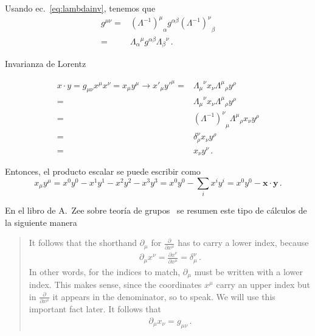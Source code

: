 \begin{frame}
Usando ec.~\eqref{eq:lambdainv}, tenemos que
\begin{align}
  \label{eq:Lambdacontra}
  g^{\mu\nu}=&{\left( \Lambda^{-1} \right)^{\mu}}_{\alpha}g^{\alpha\beta} {\left( \Lambda^{-1} \right)^{\nu}}_{\beta}\nonumber\\
=&{\Lambda_{\alpha}}^{\mu}g^{\alpha\beta}{\Lambda_{\beta}}^{\nu}\,.           
\end{align}


\end{frame}



\begin{frame}
\begin{example}
  


Invarianza de Lorentz

  \begin{align}
  x\cdot y= g_{\mu\nu}x^{\mu}x^{\nu}=  x_\mu y^\mu\to x'_\mu{y'}^\mu=&{\Lambda_\mu}^\nu x_\nu{\Lambda^\mu}_\rho y^\rho \nonumber\\
    =&{\Lambda_\mu}^\nu x_\nu{\Lambda^\mu}_\rho y^\rho \nonumber\\
    =&{\left(\Lambda^{-1}\right)^\nu}_\mu{\Lambda^\mu}_\rho x_\nu y^\rho \nonumber\\
    =&\delta^\nu_\rho x_\nu y^\rho \nonumber\\
    =&x_\nu y^\nu \nonumber\,.
  \end{align}

  Entonces, el producto escalar se puede escribir como
\begin{equation}
  x_\mu y^\mu=x^0y^0-x^1y^1-x^2y^2-x^3y^3=x^0y^0-\sum_{i}x^i y^i=x^0y^0-\boldsymbol{x}\cdot \boldsymbol{y}\,.
\end{equation}

\end{example}

\end{frame}

En el libro de A.~Zee sobre teoría de grupos~\cite{Zee:2016fuk} se resumen este tipo de cálculos de la siguiente manera
\begin{quote}
  It follows that the shorthand $\partial_{\mu}$  for  $\frac{\partial}{\partial x^{\mu}}$  has to carry a lower index, because
  \begin{align}
  {\partial_{\mu} x^{\nu}=\frac{\partial x^{\nu}}{\partial x^{\mu}}=\delta_{\mu}^{\nu}}\,.  
  \end{align}
  In other words, for the indices to match, $\partial_{\mu}$  must be written with a lower index. This makes sense, since the coordinates $x^{\mu}$
  carry an upper index but in $\frac{\partial}{\partial x^{\mu}}$  it appears in the denominator, so to speak.
  We will use this important fact later. It follows that
  \begin{align}
  {\partial_{\mu} x_{\nu}=g_{\mu \nu}}\,.  
  \end{align}
\end{quote}



